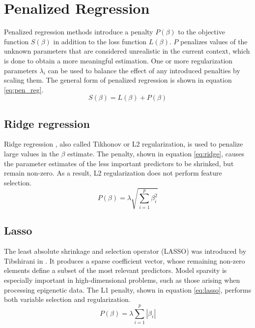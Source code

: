 \section{Penalized Regression}
Penalized regression methods introduce a penalty $P(\beta)$ to the objective function $S(\beta)$ in addition to the loss function $L(\beta)$. $P$ penalizes values of the unknown parameters that are considered unrealistic in the current context, which is done to obtain a more meaningful estimation. One or more regularization parameters $\lambda_i$ can be used to balance the effect of any introduced penalties by scaling them. The general form of penalized regression is shown in equation \ref{eq:pen_reg}. 
\begin{equation} \label{eq:pen_reg}
S(\beta) = L(\beta) + P(\beta)
\end{equation}


\subsection{Ridge regression}
Ridge regression \cite{hoerl1970ridge}, also called Tikhonov or L2 regularization, is used to penalize large values in the $\beta$ estimate. The penalty, shown in equation \ref{eq:ridge}, causes the parameter estimates of the less important predictors to be shrinked, but remain non-zero. As a result, L2 regularization does not perform feature selection.
\begin{equation} \label{eq:ridge}
P(\beta) = \lambda\sqrt{\sum_{i=1}^{p}\beta_i^2}
\end{equation}


\subsection{Lasso}
The least absolute shrinkage and selection operator (LASSO) was introduced by Tibshirani in \cite{tibshirani1996regression}. It produces a sparse coefficient vector, whose remaining non-zero elements define a subset of the most relevant predictors. Model sparsity is especially important in high-dimensional problems, such as those arising when processing epigenetic data. The L1 penalty, shown in equation \ref{eq:lasso}, performs both variable selection and regularization.
\begin{equation} \label{eq:lasso}
P(\beta) = \lambda\sum_{i=1}^{p}\left|\beta_i\right|
\end{equation}



